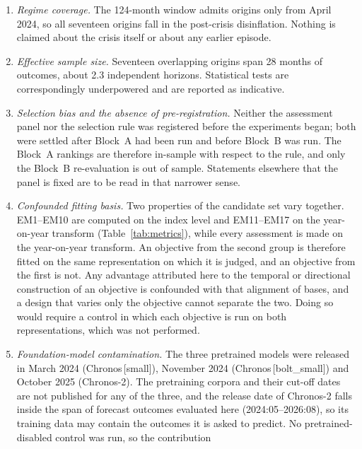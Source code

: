 \documentclass[12pt]{article}
\begin{document}
\begin{enumerate}
    \item \emph{Regime coverage.} The 124-month window admits origins only from
          April 2024, so all seventeen origins fall in the post-crisis
          disinflation. Nothing is claimed about the crisis itself or about
          any earlier episode.
    \item \emph{Effective sample size.} Seventeen overlapping origins span 28
          months of outcomes, about 2.3 independent horizons. Statistical tests
          are correspondingly underpowered and are reported as indicative.
    \item \emph{Selection bias and the absence of pre-registration.} Neither
          the assessment panel nor the selection rule was registered before the
          experiments began; both were settled after Block~A had been run and
          before Block~B was run. The Block~A rankings are therefore in-sample
          with respect to the rule, and only the Block~B re-evaluation is out
          of sample. Statements elsewhere that the panel is fixed are to be
          read in that narrower sense.
    \item \emph{Confounded fitting basis.} Two properties of the candidate set
          vary together. EM1--EM10 are computed on the index level and
          EM11--EM17 on the year-on-year transform
          (Table~\ref{tab:metrics}), while every assessment is made on the
          year-on-year transform. An objective from the second group is
          therefore fitted on the same representation on which it is judged,
          and an objective from the first is not. Any advantage attributed
          here to the temporal or directional construction of an objective is
          confounded with that alignment of bases, and a design that varies
          only the objective cannot separate the two. Doing so would require a
          control in which each objective is run on both representations,
          which was not performed.
    \item \emph{Foundation-model contamination.} The three pretrained models
          were released in March 2024 (Chronos\,[small]), November 2024
          (Chronos\,[bolt\_small]) and October 2025 (Chronos-2). The
          pretraining corpora and their cut-off dates are not published for any
          of the three, and the release date of Chronos-2 falls inside the span
          of forecast outcomes evaluated here (2024:05--2026:08), so its
          training data may contain the outcomes it is asked to predict. No pretrained-disabled control was run, so the contribution

\end{enumerate}
\end{document}
